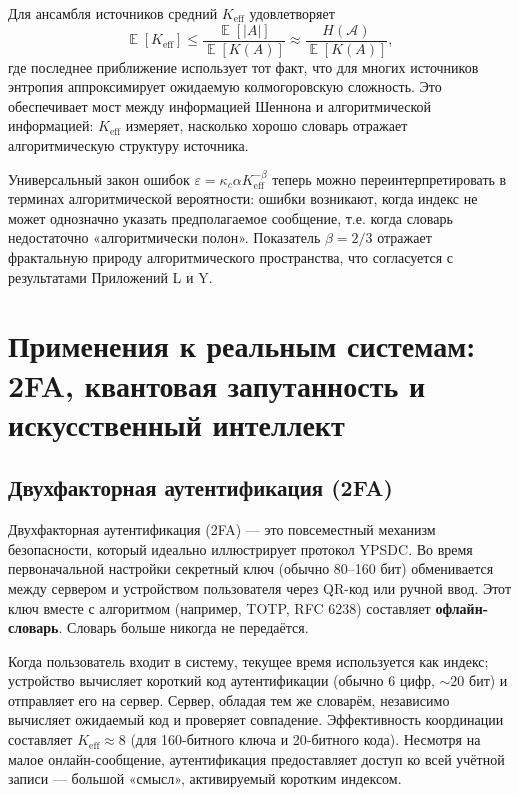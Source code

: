\documentclass[12pt,a4paper]{article}
\theoremstyle{remark}
\newcommand{\Keff}{K_{\mathrm{eff}}}
\DeclareMathOperator{\E}{\mathbb{E}}
\begin{document}
	Для ансамбля источников средний $\Keff$ удовлетворяет
	\begin{equation}
		\E[\Keff] \le \frac{\E[|A|]}{\E[K(A)]} \approx \frac{H(\mathcal{A})}{\E[K(A)]},
	\end{equation}
	где последнее приближение использует тот факт, что для многих источников энтропия аппроксимирует ожидаемую колмогоровскую сложность. Это обеспечивает мост между информацией Шеннона и алгоритмической информацией: $\Keff$ измеряет, насколько хорошо словарь отражает алгоритмическую структуру источника.
	
	Универсальный закон ошибок $\varepsilon = \kappa_c \alpha K_{\mathrm{eff}}^{-\beta}$ теперь можно переинтерпретировать в терминах алгоритмической вероятности: ошибки возникают, когда индекс не может однозначно указать предполагаемое сообщение, т.е. когда словарь недостаточно «алгоритмически полон». Показатель $\beta = 2/3$ отражает фрактальную природу алгоритмического пространства, что согласуется с результатами Приложений L и Y.
	
	\section{Применения к реальным системам: 2FA, квантовая запутанность и искусственный интеллект}
	\label{sec:applications}
	
	\subsection{Двухфакторная аутентификация (2FA)}
	
	Двухфакторная аутентификация (2FA) — это повсеместный механизм безопасности, который идеально иллюстрирует протокол YPSDC. Во время первоначальной настройки секретный ключ (обычно 80–160 бит) обменивается между сервером и устройством пользователя через QR-код или ручной ввод. Этот ключ вместе с алгоритмом (например, TOTP, RFC 6238) составляет \textbf{офлайн-словарь}. Словарь больше никогда не передаётся.
	
	Когда пользователь входит в систему, текущее время используется как индекс; устройство вычисляет короткий код аутентификации (обычно 6 цифр, $\sim 20$ бит) и отправляет его на сервер. Сервер, обладая тем же словарём, независимо вычисляет ожидаемый код и проверяет совпадение. Эффективность координации составляет $\Keff \approx 8$ (для 160-битного ключа и 20-битного кода). Несмотря на малое онлайн-сообщение, аутентификация предоставляет доступ ко всей учётной записи — большой «смысл», активируемый коротким индексом.
	
\end{document}
